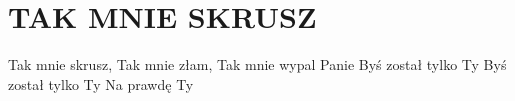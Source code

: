 \documentclass[../../../songbook.tex]{subfiles}
\begin{document}
\TabPositions{8cm} %
\section*{TAK MNIE SKRUSZ}
{}
\vspace{0.5cm}

Tak mnie skrusz,		\newline
Tak mnie złam,			\newline
Tak mnie wypal Panie	\newline
Byś został tylko Ty		\newline
Byś został tylko Ty		\newline
Na prawdę Ty			\newline
\end{document}
